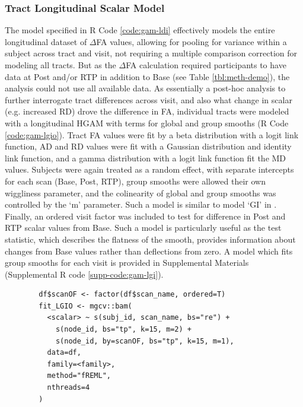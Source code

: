 \documentclass[12pt]{article}
\begin{document}
\subsubsection{Tract Longitudinal Scalar Model}
\label{sssec:meth-gam-lgio}
The model specified in R Code \ref{code:gam-ldi} effectively models the entire longitudinal dataset of $\Delta$FA values, allowing for pooling for variance within a subject across tract and visit, not requiring a multiple comparison correction for modeling all tracts. But as the $\Delta$FA calculation required participants to have data at Post and/or RTP in addition to Base (see Table \ref{tbl:meth-demo}), the analysis could not use all available data. As essentially a post-hoc analysis to further interrogate tract differences across visit, and also what change in scalar (e.g. increased RD) drove the difference in FA, individual tracts were modeled with a longitudinal HGAM with terms for global and group smooths (R Code \ref{code:gam-lgio}). Tract FA values were fit by a beta distribution with a logit link function, AD and RD values were fit with a Gaussian distribution and identity link function, and a gamma distribution with a logit link function fit the MD values. Subjects were again treated as a random effect, with separate intercepts for each scan (Base, Post, RTP), group smooths were allowed their own wiggliness parameter, and the colinearity of global and group smooths was controlled by the `m' parameter. Such a model is similar to model `GI' in \textcite{pedersen2019HierarchicalGeneralizedAdditive}. Finally, an ordered visit factor was included to test for difference in Post and RTP scalar values from Base. Such a model is particularly useful as the test statistic, which describes the flatness of the smooth, provides information about changes from Base values rather than deflections from zero. A model which fits group smooths for each visit is provided in Supplemental Materials (Supplemental R code \ref{supp-code:gam-lgi}).

\begin{equ}[H]
	\begin{lstlisting}
		df$scanOF <- factor(df$scan_name, ordered=T)
		fit_LGIO <- mgcv::bam(
		  <scalar> ~ s(subj_id, scan_name, bs="re") +
		    s(node_id, bs="tp", k=15, m=2) +
		    s(node_id, by=scanOF, bs="tp", k=15, m=1),
		  data=df,
		  family=<family>,
		  method="fREML",
		  nthreads=4
		)
	\end{lstlisting}
	\caption{Tract scalars are modeled as a function of tract node with thin-plate regression splines using both global and group (\lstinline{scan_name}) smooths as well as individual group wiggliness. An ordered factor of scan visit was used to compare Post and RTP to Base. \lstinline{<scalar>} = relevant DWI metric (AD, RD, MD, or FA), \lstinline{scan_name} = visit identifier factor (Base, Post, RTP), \lstinline{scanOf} = ordered factor of \lstinline{scan_name}, \lstinline{<family>} = relevant family and link function for scalar distribution.}
	\label{code:gam-lgio}
\end{equ}
\end{document}
